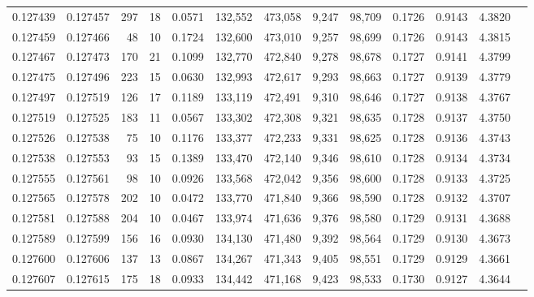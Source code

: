 \begin{tabular}{rrrrrrrrrrrrr}
0.127439 & 0.127457 &   297 &  18 &                                     0.0571 & 132,552 & 473,058 &   9,247 &  98,709 & 0.1726 & 0.9143 & 4.3820 \\
0.127459 & 0.127466 &    48 &  10 &                                     0.1724 & 132,600 & 473,010 &   9,257 &  98,699 & 0.1726 & 0.9143 & 4.3815 \\
0.127467 & 0.127473 &   170 &  21 &                                     0.1099 & 132,770 & 472,840 &   9,278 &  98,678 & 0.1727 & 0.9141 & 4.3799 \\
0.127475 & 0.127496 &   223 &  15 &                                     0.0630 & 132,993 & 472,617 &   9,293 &  98,663 & 0.1727 & 0.9139 & 4.3779 \\
0.127497 & 0.127519 &   126 &  17 &                                     0.1189 & 133,119 & 472,491 &   9,310 &  98,646 & 0.1727 & 0.9138 & 4.3767 \\
0.127519 & 0.127525 &   183 &  11 &                                     0.0567 & 133,302 & 472,308 &   9,321 &  98,635 & 0.1728 & 0.9137 & 4.3750 \\
0.127526 & 0.127538 &    75 &  10 &                                     0.1176 & 133,377 & 472,233 &   9,331 &  98,625 & 0.1728 & 0.9136 & 4.3743 \\
0.127538 & 0.127553 &    93 &  15 &                                     0.1389 & 133,470 & 472,140 &   9,346 &  98,610 & 0.1728 & 0.9134 & 4.3734 \\
0.127555 & 0.127561 &    98 &  10 &                                     0.0926 & 133,568 & 472,042 &   9,356 &  98,600 & 0.1728 & 0.9133 & 4.3725 \\
0.127565 & 0.127578 &   202 &  10 &                                     0.0472 & 133,770 & 471,840 &   9,366 &  98,590 & 0.1728 & 0.9132 & 4.3707 \\
0.127581 & 0.127588 &   204 &  10 &                                     0.0467 & 133,974 & 471,636 &   9,376 &  98,580 & 0.1729 & 0.9131 & 4.3688 \\
0.127589 & 0.127599 &   156 &  16 &                                     0.0930 & 134,130 & 471,480 &   9,392 &  98,564 & 0.1729 & 0.9130 & 4.3673 \\
0.127600 & 0.127606 &   137 &  13 &                                     0.0867 & 134,267 & 471,343 &   9,405 &  98,551 & 0.1729 & 0.9129 & 4.3661 \\
0.127607 & 0.127615 &   175 &  18 &                                     0.0933 & 134,442 & 471,168 &   9,423 &  98,533 & 0.1730 & 0.9127 & 4.3644 \\

\end{tabular}
